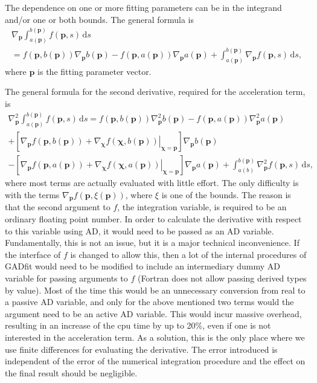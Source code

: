 \documentclass{article}
\newcommand{\D}{\,\textrm{d}}
\begin{document}
The dependence on one or more fitting parameters can be in the
integrand and/or one or both bounds. The general formula is
\begin{multline}
  \label{eq:grad_f}
  \nabla_{\bm p} \int_{a(\bm p)}^{b(\bm p)} f(\bm p, s) \D s \\
  = f(\bm p, b(\bm p)) \nabla_{\bm p} b(\bm p) - f(\bm p, a(\bm p))
  \nabla_{\bm p} a(\bm p) + \int_{a(\bm p)}^{b(\bm p)} \nabla_{\bm p}
  f(\bm p, s) \D s,
\end{multline}
where $\bm p$ is the fitting parameter vector.

The general formula for the second derivative, required for the
acceleration term, is
\begin{multline}
  \label{eq:nabla2_f}
  \nabla_{\bm p}^2 \int_{a(\bm p)}^{b(\bm p)} f(\bm p,s) \D s = f(\bm
  p,b(\bm p)) \nabla_{\bm p}^2 b(\bm p) - f(\bm p,a(\bm p))
  \nabla_{\bm p}^2 a(\bm p) \\
  + \left[ \nabla_{\bm p} f(\bm p,b(\bm p)) + \left. \nabla_{\bm\chi}
      f(\bm\chi,b(\bm p)) \right|_{\bm\chi=\bm p} \right] \nabla_{\bm
    p} b(\bm p) \\
  - \left[ \nabla_{\bm p} f(\bm p,a(\bm p)) + \left. \nabla_{\bm\chi}
      f(\bm\chi,a(\bm p)) \right|_{\bm\chi=\bm p} \right] \nabla_{\bm
    p} a(\bm p) + \int_{a(b)}^{b(\bm p)} \nabla_{\bm p}^2 f(\bm p,s)
  \D s,
\end{multline}
where most terms are actually evaluated with little effort. The only
difficulty is with the terms $\nabla_{\bm p} f(\bm p,\xi(\bm p))$,
where $\xi$ is one of the bounds. The reason is that the second
argument to $f$, the integration variable, is required to be an
ordinary floating point number. In order to calculate the derivative
with respect to this variable using AD, it would need to be passed as
an AD variable. Fundamentally, this is not an issue, but it is a major
technical inconvenience. If the interface of $f$ is changed to allow
this, then a lot of the internal procedures of GADfit would need to be
modified to include an intermediary dummy AD variable for passing
arguments to $f$ (Fortran does not allow passing derived types by
value). Most of the time this would be an unnecessary conversion from
real to a passive AD variable, and only for the above mentioned two
terms would the argument need to be an active AD variable. This would
incur massive overhead, resulting in an increase of the cpu time by up
to 20\%, even if one is not interested in the acceleration term. As a
solution, this is the only place where we use finite differences for
evaluating the derivative. The error introduced is independent of the
error of the numerical integration procedure and the effect on the
final result should be negligible.
\end{document}
